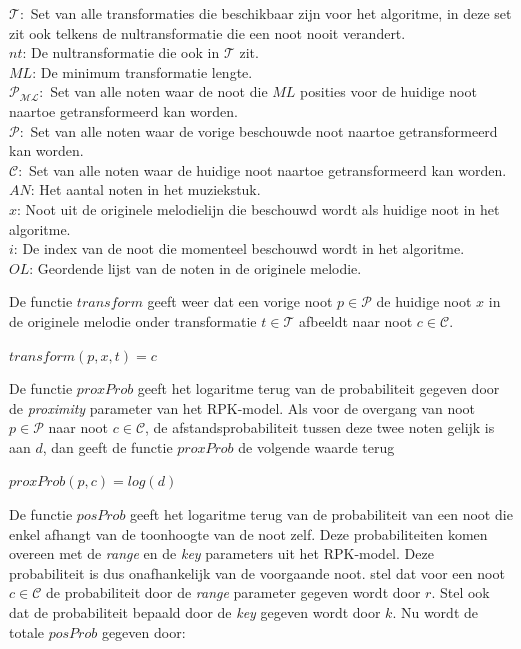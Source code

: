 \begin{framed}
\noindent
$\mathcal{T}:$ Set van alle transformaties die beschikbaar zijn voor het algoritme, in deze set zit ook telkens de nultransformatie die een noot nooit verandert.\\
$nt$: De nultransformatie die ook in $\mathcal{T}$ zit.\\
$ML$: De minimum transformatie lengte.\\
$\mathcal{P_{ML}}:$ Set van alle noten waar de noot die $ML$ posities voor de huidige noot naartoe getransformeerd kan worden.\\
$\mathcal{P}:$ Set van alle noten waar de vorige beschouwde noot naartoe getransformeerd kan worden.\\
$\mathcal{C}:$ Set van alle noten waar de huidige noot naartoe getransformeerd kan worden.\\
$AN$: Het aantal noten in het muziekstuk.\\
$x$: Noot uit de originele melodielijn die beschouwd wordt als huidige noot in het algoritme.\\
$i$: De index van de noot die momenteel beschouwd wordt in het algoritme.\\
$OL$: Geordende lijst van de noten in de originele melodie.
\end{framed}

De functie $transform$ geeft weer dat een vorige noot $p\in \mathcal{P}$ de huidige noot $x$ in de originele melodie onder transformatie $t\in \mathcal{T}$ afbeeldt naar noot $c\in \mathcal{C}$.

\begin{framed}
\noindent
$transform(p,x,t)=c$
\end{framed}

De functie $proxProb$ geeft het logaritme terug van de probabiliteit gegeven door de \textit{proximity} parameter van het RPK-model. Als voor de overgang van noot $p\in \mathcal{P}$ naar noot $c\in \mathcal{C}$, de afstandsprobabiliteit tussen deze twee noten gelijk is aan $d$, dan geeft de functie $proxProb$ de volgende waarde terug

\begin{framed}
\noindent
$proxProb(p,c)=log(d)$
\end{framed}

De functie $posProb$ geeft het logaritme terug van de probabiliteit van een noot die enkel afhangt van de toonhoogte van de noot zelf. Deze probabiliteiten komen overeen met de \textit{range} en de \textit{key} parameters uit het RPK-model. Deze probabiliteit is dus onafhankelijk van de voorgaande noot. stel dat voor een noot $c\in \mathcal{C}$ de probabiliteit door de \textit{range} parameter gegeven wordt door $r$. Stel ook dat de probabiliteit bepaald door de \textit{key} gegeven wordt door $k$. Nu wordt de totale $posProb$ gegeven door:

